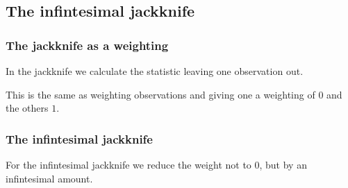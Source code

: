 
\subsection{The infintesimal jackknife}

\subsubsection{The jackknife as a weighting}

In the jackknife we calculate the statistic leaving one observation out.

This is the same as weighting observations and giving one a weighting of \(0\) and the others \(1\).

\subsubsection{The infintesimal jackknife}

For the infintesimal jackknife we reduce the weight not to \(0\), but by an infintesimal amount.

